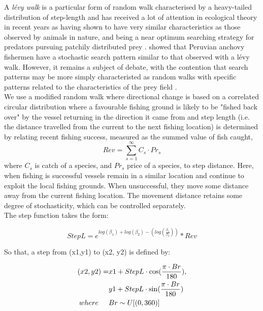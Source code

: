 \documentclass[review]{elsarticle}
\begin{document}
A \textit{lévy walk} is a particular form of random walk characterised by a
heavy-tailed distribution of step-length and has received a lot of attention in
ecological theory in recent years as having shown to have very similar
characteristics as those observed by animals in nature, and being a near
optimum searching strategy for predators pursuing patchily distributed prey
\cite{Bartumeus2005, Sims2008}.  \cite{Bertrand2007} showed that Peruvian
anchovy fishermen have a stochastic search pattern similar to that observed
with a lévy walk. However, it remains a subject of debate, with the contention
that search patterns may be more simply characteristed as random walks
\cite{Sakiyama2013} with specific patterns related to the characteristics of
the prey field \cite{Sims2012}. \\

We use a modified random walk where directional change is based on a correlated
circular distribution where a favourable fishing ground is likely to be "fished
back over" by the vessel returning in the direction it came from and step
length (i.e. the distance travelled from the current to the next fishing
location) is determined by relating recent fishing success, measured as the
summed value of fish caught, $$Rev = \sum_{s=1}^{\infty} C_{s} \cdot Pr_{s}$$
where $C_{s}$ is catch of a species, and $Pr_{s}$ price of a species, to step
distance. Here, when fishing is successful vessels remain in a similar location
and continue to exploit the local fishing grounds. When unsuccessful, they move
some distance away from the current fishing location. The movement distance
retains some degree of stochasticity, which can be controlled separately. \\

The step function takes the form:

\begin{equation*}
	StepL = e^{log(\beta_{1}) + log(\beta_{2}) - (log(\frac{\beta_{1}}{\beta_{3}}))} * Rev
\end{equation*}

So that, a step from (x1,y1) to (x2, y2) is defined by:

\begin{equation*}
	\begin{split}
 (x2, y2) =  & x1 + StepL \cdot \cos (\frac{\pi \cdot Br}{180}), \\
             & y1 + StepL \cdot \sin (\frac{\pi \cdot Br}{180}) \\	
 where \hspace{0.5cm}     & Br \sim U[(0,360)]
	\end{split}
\end{equation*}
\end{document}
